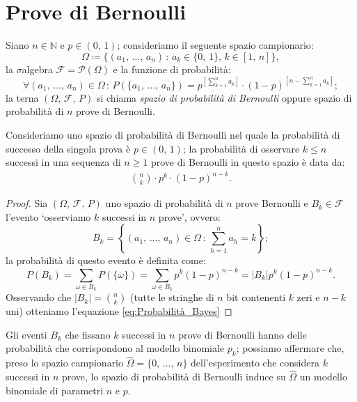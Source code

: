     \section{Prove di Bernoulli}
        \begin{defn}
            Siano $n \in \mathbb{N}$ e $p \in (0,\,1)$; consideriamo il seguente spazio campionario: \[
                \Omega \coloneqq \{(a_1,\,\ldots,\,a_n)\,:\,a_k \in \{0,\,1\},\, k \in [1,\,n]\}
                ,\] la $\sigma$\nbdash algebra $\mathscr{F} = \mathscr{P}(\Omega)$ e la funzione di probabilità: \[
                \forall (a_1,\, \ldots,\, a_n) \in \Omega \,:\, P(\{a_1,\, \ldots,\, a_n\}) = p^{\left[\sum_{k=1}^{n} a_k\right]} \cdot (1 - p)^{\left[n - \sum_{k=1}^{n} a_k\right]}
            ;\] 
            la terna $(\Omega,\,\mathscr{F},\,P)$ si chiama \textit{spazio di probabilità di Bernoulli} oppure spazio di probabilità di $n$ prove di Bernoulli.
        \end{defn}
        \begin{prty}
            Consideriamo uno spazio di probabilità di Bernoulli nel quale la probabilità di successo della singola prova è $p \in (0,\,1)$; la probabilità di osservare $k \leq n$ successi in una sequenza di $n \geq 1$ prove di Bernoulli in questo spazio è data da:
            \begin{align}\label{eq:Probabilità_Bayes}
                \binom{n}{k} \cdot p^{k} \cdot (1 - p)^{n-k}
            .
            \end{align}
        \end{prty}
        \begin{proof}
            Sia $(\Omega,\,\mathscr{F},\,P )$ uno spazio di probabilità di $n$ prove Bernoulli e $B_k \in \mathscr{F}$ l'evento `osserviamo $k$ successi in $n$ prove', ovvero: \[
                B_k = \left\{ (a_1,\, \ldots,\, a_n) \in \Omega \,:\, \sum_{h=1}^{n} a_h = k \right\} 
            ;\] la probabilità di questo evento è definita come: \[
                P(B_k) = \sum_{\omega \in B_k} P(\{\omega\}) = \sum_{\omega \in B_k} p^{k}(1 - p)^{n - k} = |B_k|p^{k}(1 - p)^{n - k}
            .\] Osservando che $|B_k| = \binom{n}{k}$ (tutte le stringhe di $n$ bit contenenti $k$ zeri e $n - k$ uni) otteniamo l'equazione \eqref{eq:Probabilità_Bayes}
        \end{proof}
    \begin{obsv}
        Gli eventi $B_k$ che fissano $k$ successi in $n$ prove di Bernoulli hanno delle probabilità che corrispondono al modello binomiale $p_k$; possiamo affermare che, preso lo spazio campionario $\hat{\Omega} = \{0,\,\ldots,\,n\}$ dell'esperimento che considera $k$ successi in $n$ prove, lo spazio di probabilità di Bernoulli induce su $\hat{\Omega}$ un modello binomiale di parametri $n$ e $p$.
    \end{obsv} 
